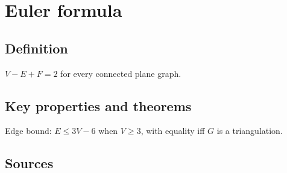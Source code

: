 \section{Euler formula}

\subsection*{Definition}
$V - E + F = 2$ for every connected plane graph.

\subsection*{Key properties and theorems}
Edge bound: $E \le 3V - 6$ when $V \ge 3$, with equality iff $G$ is a triangulation.

\subsection*{Sources}
\cite{sample2020kempe}
